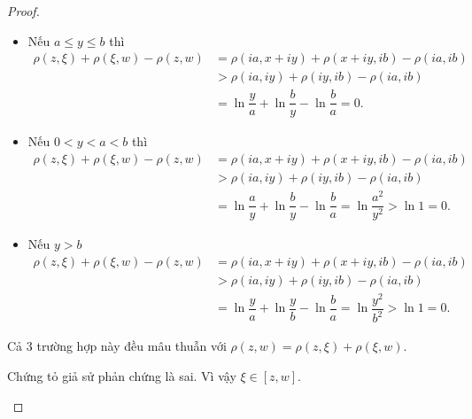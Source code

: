 \begin{proof}
\begin{enumerate}
\begin{itemize}
\begin{itemize}
                \item Nếu $a\leq y \leq b$ thì 
                \begin{align*}
                    \rho(z,\xi) + \rho(\xi,w) - \rho(z,w) &= \rho(ia,x+iy) + \rho(x+iy,ib) - \rho(ia,ib)\\
                    &> \rho(ia,iy) + \rho(iy,ib) -\rho(ia,ib)\\
                    &=\ln{\dfrac{y}{a}} + \ln{\dfrac{b}{y}} - \ln{\dfrac{b}{a}} = 0.
                \end{align*}
                \item Nếu $0<y<a<b$ thì 
                \begin{align*}
                    \rho(z,\xi) + \rho(\xi,w) - \rho(z,w) &= \rho(ia,x+iy) + \rho(x+iy,ib) - \rho(ia,ib)\\
                    &> \rho(ia,iy) + \rho(iy,ib) -\rho(ia,ib)\\
                    &=\ln{\dfrac{a}{y}} + \ln{\dfrac{b}{y}} - \ln{\dfrac{b}{a}} = \ln{\dfrac{a^2}{y^2}} > \ln{1} = 0.
                \end{align*}
                \item Nếu $y>b$
                \begin{align*}
                    \rho(z,\xi) + \rho(\xi,w) - \rho(z,w) &= \rho(ia,x+iy) + \rho(x+iy,ib) - \rho(ia,ib)\\
                    &> \rho(ia,iy) + \rho(iy,ib) -\rho(ia,ib)\\
                    &=\ln{\dfrac{y}{a}} + \ln{\dfrac{y}{b}} - \ln{\dfrac{b}{a}} = \ln{\dfrac{y^2}{b^2}} > \ln{1} = 0.
                \end{align*}
            \end{itemize}
            Cả 3 trường hợp này đều mâu thuẫn với $\rho(z,w) = \rho(z,\xi) + \rho(\xi,w)$.
        \end{itemize}
        Chứng tỏ giả sử phản chứng là sai. Vì vậy $\xi \in [z,w]$.
    \end{enumerate}
\end{proof}
    
